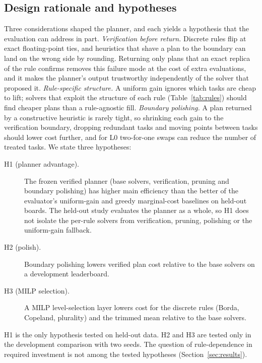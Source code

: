 \documentclass{article}
\begin{document}
\subsection{Design rationale and hypotheses}
Three considerations shaped the planner, and each yields a hypothesis that the evaluation can address in part.
\emph{Verification before return.} Discrete rules flip at exact floating-point ties, and heuristics that shave a plan to the boundary can land on the wrong side by rounding. Returning only plans that an exact replica of the rule confirms removes this failure mode at the cost of extra evaluations, and it makes the planner's output trustworthy independently of the solver that proposed it. \emph{Rule-specific structure.} A uniform gain ignores which tasks are cheap to lift; solvers that exploit the structure of each rule (Table~\ref{tab:rules}) should find cheaper plans than a rule-agnostic fill. \emph{Boundary polishing.} A plan returned by a constructive heuristic is rarely tight, so shrinking each gain to the verification boundary, dropping redundant tasks and moving points between tasks should lower cost further, and for L0 two-for-one swaps can reduce the number of treated tasks. We state three hypotheses:
\begin{description}
\item[H1 (planner advantage).] The frozen verified planner (base solvers, verification, pruning and boundary polishing) has higher main efficiency than the better of the evaluator's uniform-gain and greedy marginal-cost baselines on held-out boards. The held-out study evaluates the planner as a whole, so H1 does not isolate the per-rule solvers from verification, pruning, polishing or the uniform-gain fallback.
\item[H2 (polish).] Boundary polishing lowers verified plan cost relative to the base solvers on a development leaderboard.
\item[H3 (MILP selection).] A MILP level-selection layer lowers cost for the discrete rules (Borda, Copeland, plurality) and the trimmed mean relative to the base solvers.
\end{description}
H1 is the only hypothesis tested on held-out data. H2 and H3 are tested only in the development comparison with two seeds. The question of rule-dependence in required investment is not among the tested hypotheses (Section~\ref{sec:results}).
\end{document}
